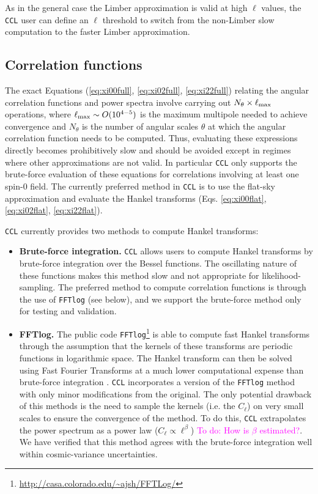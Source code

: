 \documentclass[\docopts]{\docclass}
\newcommand{\todo}[1]{\textcolor{magenta}{To do: #1}}
\newcommand{\ccl}{{\tt CCL}\xspace}
\begin{document}
As in the general case the Limber approximation is valid at high $\ell$ values, the \ccl user can define an $\ell$ threshold to switch from the non-Limber slow computation to the faster Limber approximation.
 


\subsection{Correlation functions}

The exact Equations (\ref{eq:xi00full}, \ref{eq:xi02full}, \ref{eq:xi22full}) relating the angular correlation functions and power spectra involve carrying out $N_\theta\times\ell_{\rm max}$ operations, where $\ell_{\rm max}\sim O(10^{4-5})$ is the maximum multipole needed to achieve convergence and $N_\theta$ is the number of angular scales $\theta$ at which the angular correlation function needs to be computed. Thus, evaluating these expressions directly becomes prohibitively slow and should be avoided except in regimes where other approximations are not valid. In particular \ccl only supports the brute-force evaluation of these equations for correlations involving at least one spin-0 field. The currently preferred method in \ccl is to use the flat-sky approximation and evaluate the Hankel transforms (Eqs. \ref{eq:xi00flat}, \ref{eq:xi02flat}, \ref{eq:xi22flat}).

\ccl currently provides two methods to compute Hankel transforms:
\begin{itemize}
 \item {\bf Brute-force integration.} \ccl allows users to compute Hankel transforms by brute-force integration over the Bessel functions. The oscillating nature of these functions makes this method slow and not appropriate for likelihood-sampling. The preferred method to compute correlation functions is through the use of {\tt FFTlog} (see below), and we support the brute-force method only for testing and validation.
 \item {\bf FFTlog.} The public code {\tt FFTlog}\footnote{\url{http://casa.colorado.edu/~ajsh/FFTLog/}} is able to compute fast Hankel transforms through the assumption that the kernels of these transforms are periodic functions in logarithmic space. The Hankel transform can then be solved using Fast Fourier Transforms at a much lower computational expense than brute-force integration \citep{Hamilton2000,Talman2009}. \ccl incorporates a version of the {\tt FFTlog} method with only minor modifications from the original. The only potential drawback of this methods is the need to sample the kernels (i.e. the $C_\ell$) on very small scales to ensure the convergence of the method. To do this, \ccl extrapolates the power spectrum as a power law ($C_\ell\propto\ell^\beta$) \todo{How is $\beta$ estimated?}. We have verified that this method agrees with the brute-force integration  well within cosmic-variance uncertainties.
\end{itemize}
\end{document}
